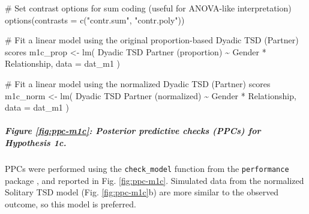 \documentclass[
  bookmarksnumbered]{article}
\newenvironment{Shaded}{\begin{snugshade}}{\end{snugshade}}
\newcommand{\AttributeTok}[1]{\textcolor[rgb]{0.80,0.80,0.80}{#1}}
\newcommand{\CommentTok}[1]{\textcolor[rgb]{0.50,0.62,0.50}{#1}}
\newcommand{\FunctionTok}[1]{\textcolor[rgb]{0.94,0.94,0.56}{#1}}
\newcommand{\NormalTok}[1]{\textcolor[rgb]{0.80,0.80,0.80}{#1}}
\newcommand{\OtherTok}[1]{\textcolor[rgb]{0.94,0.94,0.56}{#1}}
\newcommand{\SpecialCharTok}[1]{\textcolor[rgb]{0.86,0.64,0.64}{#1}}
\newcommand{\StringTok}[1]{\textcolor[rgb]{0.80,0.58,0.58}{#1}}
\begin{document}
\begin{Shaded}
\begin{Highlighting}[]
\CommentTok{\# Set contrast options for sum coding (useful for ANOVA{-}like interpretation)}
\FunctionTok{options}\NormalTok{(}\AttributeTok{contrasts =} \FunctionTok{c}\NormalTok{(}\StringTok{"contr.sum"}\NormalTok{, }\StringTok{"contr.poly"}\NormalTok{))}

\CommentTok{\# Fit a linear model using the original proportion{-}based Dyadic TSD (Partner) scores}
\NormalTok{m1c\_prop }\OtherTok{\textless{}{-}} \FunctionTok{lm}\NormalTok{(}
  \StringTok{\textasciigrave{}}\AttributeTok{Dyadic TSD Partner (proportion)}\StringTok{\textasciigrave{}} \SpecialCharTok{\textasciitilde{}}\NormalTok{ Gender }\SpecialCharTok{*}\NormalTok{ Relationship,}
  \AttributeTok{data =}\NormalTok{ dat\_m1}
\NormalTok{)}

\CommentTok{\# Fit a linear model using the normalized Dyadic TSD (Partner) scores}
\NormalTok{m1c\_norm }\OtherTok{\textless{}{-}} \FunctionTok{lm}\NormalTok{(}
  \StringTok{\textasciigrave{}}\AttributeTok{Dyadic TSD Partner (normalized)}\StringTok{\textasciigrave{}} \SpecialCharTok{\textasciitilde{}}\NormalTok{ Gender }\SpecialCharTok{*}\NormalTok{ Relationship,}
  \AttributeTok{data =}\NormalTok{ dat\_m1}
\NormalTok{)}
\end{Highlighting}
\end{Shaded}

\subparagraph{Figure \ref{fig:ppc-m1c}: Posterior predictive checks (PPCs) for Hypothesis 1c.}\label{figure-reffigppc-m1c-posterior-predictive-checks-ppcs-for-hypothesis-1c.}

PPCs were performed using the \texttt{check\_model} function from the \texttt{performance} package \autocite{ludecke2021}, and reported in Fig. \ref{fig:ppc-m1c}. Simulated data from the normalized Solitary TSD model (Fig. \ref{fig:ppc-m1c}b) are more similar to the observed outcome, so this model is preferred.
\end{document}
